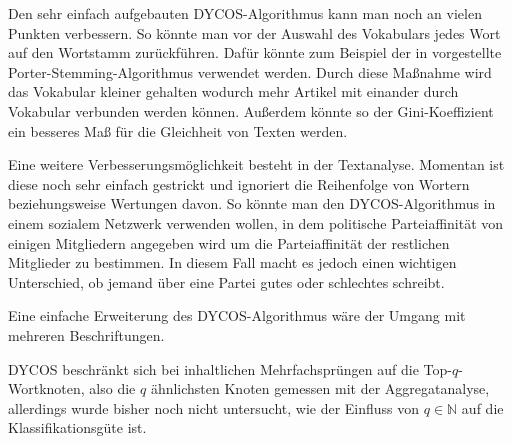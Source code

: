 Den sehr einfach aufgebauten DYCOS-Algorithmus kann man noch an
vielen Punkten verbessern. So könnte man vor der Auswahl des
Vokabulars jedes Wort auf den Wortstamm zurückführen.
Dafür könnte zum Beispiel der in \cite{porter} vorgestellte 
Porter-Stemming-Algorithmus verwendet werden. Durch diese Maßnahme wird das
Vokabular kleiner gehalten wodurch mehr Artikel mit einander
durch Vokabular verbunden werden können. Außerdem könnte so der 
Gini-Koeffizient ein besseres Maß für die Gleichheit von Texten werden.

Eine weitere Verbesserungsmöglichkeit besteht in der Textanalyse.
Momentan ist diese noch sehr einfach gestrickt und ignoriert die
Reihenfolge von Wortern beziehungsweise Wertungen davon. So könnte
man den DYCOS-Algorithmus in einem sozialem Netzwerk verwenden wollen,
in dem politische Parteiaffinität von einigen Mitgliedern angegeben
wird um die Parteiaffinität der restlichen Mitglieder zu bestimmen.
In diesem Fall macht es jedoch einen wichtigen Unterschied, ob jemand
über eine Partei gutes oder schlechtes schreibt.

Eine einfache Erweiterung des DYCOS-Algorithmus wäre der Umgang mit 
mehreren Beschriftungen.

DYCOS beschränkt sich bei inhaltlichen Mehrfachsprüngen
auf die Top-$q$-Wortknoten, also die $q$ ähnlichsten Knoten
gemessen mit der Aggregatanalyse, allerdings wurde bisher noch nicht
untersucht, wie der Einfluss von $q \in \mathbb{N}$ auf die 
Klassifikationsgüte ist.

